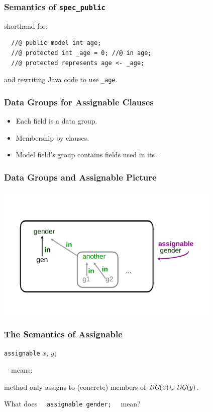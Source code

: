 \begin{frame}[fragile]
\frametitle{Semantics of \lstinline!spec_public!}


shorthand for:

\begin{lstlisting}
  //@ public model int age;
  //@ protected int _age = 0; //@ in age;
  //@ protected represents age <- _age; 
\end{lstlisting}

and rewriting Java code to use \lstinline!_age!.

\end{frame}

\begin{frame}
\frametitle{Data Groups for Assignable Clauses}
\begin{itemize}
\item
Each field is a data group.

\item
Membership by  clauses.

\item
Model field's group contains
fields used in its .
\end{itemize}
\end{frame}

\begin{frame}
\frametitle{Data Groups and Assignable Picture}
\includegraphics[width=4.25in]{datagroup}
\end{frame}

\begin{frame}[fragile]
\frametitle{The Semantics of Assignable}

\lstinline!assignable! $x$, $y$\texttt{;}

~~means:

method only assigns to (concrete) members of 
$\textit{DG}(x) \cup \textit{DG}(y)$.

\begin{question}
What does ~~\lstinline!assignable gender;!~~  mean?
\end{question}
\end{frame}

